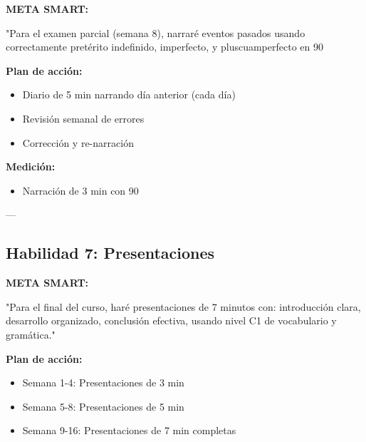 \documentclass[a4paper,11pt]{article}
\begin{document}
\textbf{META SMART:}

"Para el examen parcial (semana 8), narraré eventos pasados usando correctamente pretérito indefinido, imperfecto, y pluscuamperfecto en 90%

\vspace{0.2cm}

\textbf{Plan de acción:}

\begin{itemize}

  \item Diario de 5 min narrando día anterior (cada día)

  \item Revisión semanal de errores

  \item Corrección y re-narración

\end{itemize}

\vspace{0.2cm}

\textbf{Medición:}

\begin{itemize}

  \item [ ] Narración de 3 min con 90%

\end{itemize}

\vspace{0.2cm}

---

\vspace{0.2cm}

\subsection{Habilidad 7: Presentaciones}

\vspace{0.2cm}

\textbf{META SMART:}

"Para el final del curso, haré presentaciones de 7 minutos con: introducción clara, desarrollo organizado, conclusión efectiva, usando nivel C1 de vocabulario y gramática."

\vspace{0.2cm}

\textbf{Plan de acción:}

\begin{itemize}

  \item Semana 1-4: Presentaciones de 3 min

  \item Semana 5-8: Presentaciones de 5 min

  \item Semana 9-16: Presentaciones de 7 min completas

\end{itemize}
\end{document}
